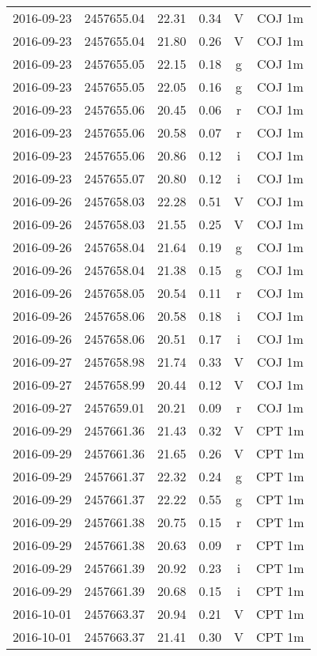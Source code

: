 \begin{table}
\begin{tabular}{cccccc}
2016-09-23 & 2457655.04 & 22.31 & 0.34 & V & COJ 1m \\
2016-09-23 & 2457655.04 & 21.80 & 0.26 & V & COJ 1m \\
2016-09-23 & 2457655.05 & 22.15 & 0.18 & g & COJ 1m \\
2016-09-23 & 2457655.05 & 22.05 & 0.16 & g & COJ 1m \\
2016-09-23 & 2457655.06 & 20.45 & 0.06 & r & COJ 1m \\
2016-09-23 & 2457655.06 & 20.58 & 0.07 & r & COJ 1m \\
2016-09-23 & 2457655.06 & 20.86 & 0.12 & i & COJ 1m \\
2016-09-23 & 2457655.07 & 20.80 & 0.12 & i & COJ 1m \\
2016-09-26 & 2457658.03 & 22.28 & 0.51 & V & COJ 1m \\
2016-09-26 & 2457658.03 & 21.55 & 0.25 & V & COJ 1m \\
2016-09-26 & 2457658.04 & 21.64 & 0.19 & g & COJ 1m \\
2016-09-26 & 2457658.04 & 21.38 & 0.15 & g & COJ 1m \\
2016-09-26 & 2457658.05 & 20.54 & 0.11 & r & COJ 1m \\
2016-09-26 & 2457658.06 & 20.58 & 0.18 & i & COJ 1m \\
2016-09-26 & 2457658.06 & 20.51 & 0.17 & i & COJ 1m \\
2016-09-27 & 2457658.98 & 21.74 & 0.33 & V & COJ 1m \\
2016-09-27 & 2457658.99 & 20.44 & 0.12 & V & COJ 1m \\
2016-09-27 & 2457659.01 & 20.21 & 0.09 & r & COJ 1m \\
2016-09-29 & 2457661.36 & 21.43 & 0.32 & V & CPT 1m \\
2016-09-29 & 2457661.36 & 21.65 & 0.26 & V & CPT 1m \\
2016-09-29 & 2457661.37 & 22.32 & 0.24 & g & CPT 1m \\
2016-09-29 & 2457661.37 & 22.22 & 0.55 & g & CPT 1m \\
2016-09-29 & 2457661.38 & 20.75 & 0.15 & r & CPT 1m \\
2016-09-29 & 2457661.38 & 20.63 & 0.09 & r & CPT 1m \\
2016-09-29 & 2457661.39 & 20.92 & 0.23 & i & CPT 1m \\
2016-09-29 & 2457661.39 & 20.68 & 0.15 & i & CPT 1m \\
2016-10-01 & 2457663.37 & 20.94 & 0.21 & V & CPT 1m \\
2016-10-01 & 2457663.37 & 21.41 & 0.30 & V & CPT 1m \\

\end{tabular}
\end{table}
